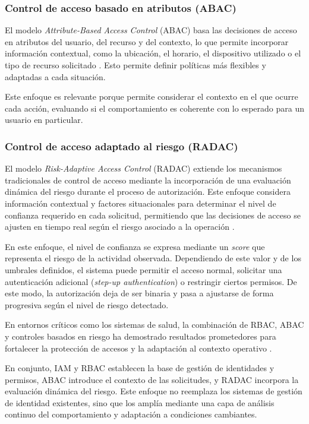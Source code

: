 \subsubsection{Control de acceso basado en atributos (ABAC)}
El modelo \emph{Attribute-Based Access Control} (ABAC) basa las decisiones de acceso en atributos del usuario, del recurso y del contexto, lo que permite incorporar información contextual, como la ubicación, el horario, el dispositivo utilizado o el tipo de recurso solicitado \parencite{Hu2014}. Esto permite definir políticas más flexibles y adaptadas a cada situación.

Este enfoque es relevante porque permite considerar el contexto en el que ocurre cada acción, evaluando si el comportamiento es coherente con lo esperado para un usuario en particular.

\subsubsection{Control de acceso adaptado al riesgo (RADAC)}\label{sec:radac-marco}
El modelo \emph{Risk-Adaptive Access Control} (RADAC) extiende los mecanismos tradicionales de control de acceso mediante la incorporación de una evaluación dinámica del riesgo durante el proceso de autorización. Este enfoque considera información contextual y factores situacionales para determinar el nivel de confianza requerido en cada solicitud, permitiendo que las decisiones de acceso se ajusten en tiempo real según el riesgo asociado a la operación \parencite{Xiao2022}.


En este enfoque, el nivel de confianza se expresa mediante un \emph{score} que representa el riesgo de la actividad observada. Dependiendo de este valor y de los umbrales definidos, el sistema puede permitir el acceso normal, solicitar una autenticación adicional (\emph{step-up authentication}) o restringir ciertos permisos. De este modo, la autorización deja de ser binaria y pasa a ajustarse de forma progresiva según el nivel de riesgo detectado.

En entornos críticos como los sistemas de salud, la combinación de RBAC, ABAC y controles basados en riesgo ha demostrado resultados prometedores para fortalecer la protección de accesos y la adaptación al contexto operativo \parencite{Atlam2025}.

En conjunto, IAM y RBAC establecen la base de gestión de identidades y permisos, ABAC introduce el contexto de las solicitudes, y RADAC incorpora la evaluación dinámica del riesgo. Este enfoque no reemplaza los sistemas de gestión de identidad existentes, sino que los amplía mediante una capa de análisis continuo del comportamiento y adaptación a condiciones cambiantes.

